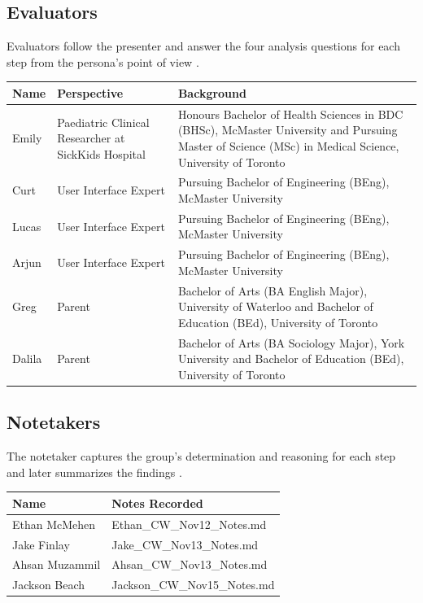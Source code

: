 \documentclass{article}
\begin{document}
\subsection{Evaluators}

Evaluators follow the presenter and answer the four analysis questions for each step from the persona's point of view \cite{nng-workshop}.

\begin{table}[H]
\centering
\begin{tabularx}{\linewidth}{@{}l l Y@{}}
\toprule
\textbf{Name} & \textbf{Perspective} & \textbf{Background} \\
\midrule
Emily & Paediatric Clinical Researcher at SickKids Hospital & Honours Bachelor of Health Sciences in BDC (BHSc), McMaster University and 
Pursuing Master of Science (MSc) in Medical Science, University of Toronto \\
Curt & User Interface Expert & Pursuing Bachelor of Engineering (BEng), McMaster University \\
Lucas & User Interface Expert & Pursuing Bachelor of Engineering (BEng), McMaster University \\
Arjun & User Interface Expert & Pursuing Bachelor of Engineering (BEng), McMaster University \\
Greg & Parent & Bachelor of Arts (BA English Major), University of Waterloo and Bachelor of Education (BEd), University of Toronto \\
Dalila & Parent & Bachelor of Arts (BA Sociology Major), York University and Bachelor of Education (BEd), University of Toronto \\
\bottomrule
\end{tabularx}
\end{table}

\subsection{Notetakers}

The notetaker captures the group's determination and reasoning for each step and later summarizes the findings \cite{nng-workshop}.

\begin{table}[H]
\centering
\begin{tabularx}{\linewidth}{@{}l Y@{}}
\toprule
\textbf{Name} & \textbf{Notes Recorded} \\
\midrule
Ethan McMehen & Ethan\_CW\_Nov12\_Notes.md \\
Jake Finlay & Jake\_CW\_Nov13\_Notes.md \\
Ahsan Muzammil & Ahsan\_CW\_Nov13\_Notes.md \\
Jackson Beach & Jackson\_CW\_Nov15\_Notes.md \\
\bottomrule
\end{tabularx}
\end{table}
\end{document}
